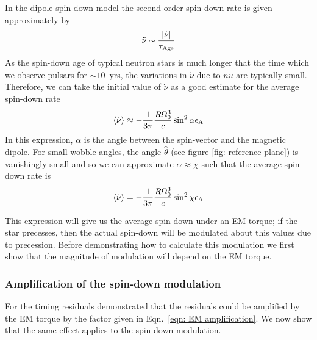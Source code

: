 \documentclass[../full_thesis/full_thesis.tex]{subfiles}
\begin{document}
In the dipole spin-down model the second-order spin-down rate is given
approximately by
\begin{align}
\ddot{\nu} \sim \frac{|\dot{\nu}|}{\tau_{\mathrm{Age}}}
\end{align}
As the spin-down age of typical neutron stars is much longer that
the time which we observe pulsars for $\sim 10$~yrs, the variations in $\dot{\nu}$
due to $\ddot{nu}$ are typically small. Therefore, we can take the initial value
of $\dot{\nu}$ as a good estimate for the average spin-down rate
\begin{align}
\langle\dot{\nu}\rangle \approx -\frac{1}{3\pi}\frac{R \Omega_{0}^{3}}{c} \sin^{2}\alpha \epsilon_{\mathrm{A}}
\label{eqn: spin-down initial EM}
\end{align}
In this expression, $\alpha$ is the angle between the spin-vector and the
magnetic dipole. For small wobble angles, the angle $\hat{\theta}$ (see figure
\ref{fig: reference plane}) is vanishingly small and so we can approximate
$\alpha \approx \chi$ such that the average spin-down rate is
\begin{equation}
    \langle \dot{\nu}\rangle = -\frac{1}{3\pi}\frac{R \Omega_{0}^{3}}{c} \sin^{2}\chi \epsilon_{\mathrm{A}}
    \label{eqn: spin-down average}
\end{equation}

This expression will give us the average spin-down under an EM torque; if the
star precesses, then the actual spin-down will be modulated about this values
due to precession. Before demonstrating how to calculate this modulation we
first show that the magnitude of modulation will depend on the EM torque.

\subsubsection{Amplification of the spin-down modulation}

For the timing residuals \citet{Jones2001} demonstrated that the residuals
could be amplified by the EM torque by the factor given in Eqn.~\ref{eqn: EM
amplification}. We now show that the same effect applies
to the spin-down modulation.
\end{document}
